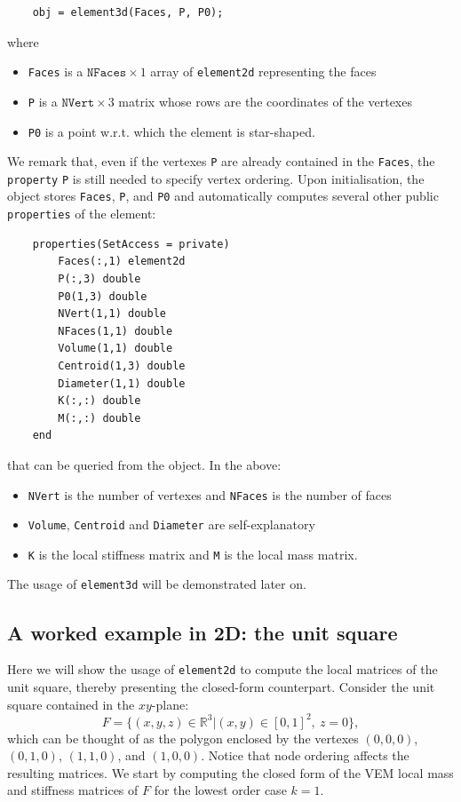 \documentclass[a4paper]{article}
\begin{document}
\begin{lstlisting}
	obj = element3d(Faces, P, P0);
\end{lstlisting}
%
where 
\begin{itemize}
\item \texttt{Faces} is a $\texttt{NFaces} \times 1$ array of \texttt{element2d} representing the faces
\item \texttt{P} is a $\texttt{NVert} \times 3$ matrix whose rows are the coordinates of the vertexes
\item \texttt{P0} is a point w.r.t. which the element is star-shaped.
\end{itemize}
We remark that, even if the vertexes \texttt{P} are already contained in the \texttt{Faces}, the \texttt{property} \texttt{P} is still needed to specify vertex ordering. Upon initialisation, the object stores \texttt{Faces}, \texttt{P}, and \texttt{P0} and automatically computes several other public \texttt{properties} of the element:

\begin{lstlisting}
	properties(SetAccess = private)
		Faces(:,1) element2d
		P(:,3) double
		P0(1,3) double
		NVert(1,1) double
		NFaces(1,1) double
		Volume(1,1) double
		Centroid(1,3) double
		Diameter(1,1) double
		K(:,:) double
		M(:,:) double
	end
\end{lstlisting}

\noindent
that can be queried from the object. In the above:
\begin{itemize}
\item \texttt{NVert} is the number of vertexes and \texttt{NFaces} is the number of faces
\item \texttt{Volume}, \texttt{Centroid} and \texttt{Diameter} are self-explanatory
\item \texttt{K} is the local stiffness matrix and \texttt{M} is the local mass matrix.
\end{itemize}

\noindent
The usage of \texttt{element3d} will be demonstrated later on.

\subsection{A worked example in 2D: the unit square}
Here we will show the usage of \texttt{element2d} to compute the local matrices of the unit square, thereby presenting the closed-form counterpart. Consider the unit square contained in the $xy$-plane:
\begin{equation}
F = \{(x,y,z) \in \mathbb{R}^3 | (x,y) \in [0,1]^2, \ z = 0\},
\end{equation}
which can be thought of as the polygon enclosed by the vertexes $(0, 0, 0)$, $(0, 1, 0)$, $(1,1, 0)$, and $(1, 0, 0)$.  Notice that node ordering affects the resulting matrices.  We start by computing the closed form of the VEM local mass and stiffness matrices of $F$ for the lowest order case $k=1$.
\end{document}
